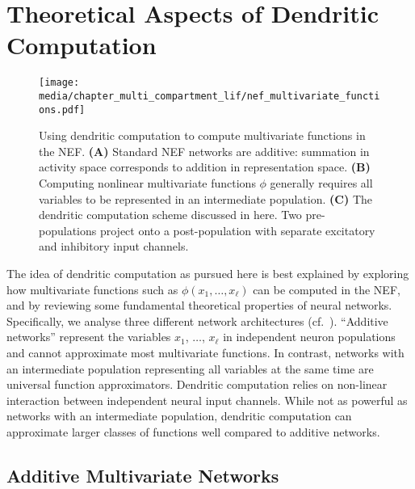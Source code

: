 \section{Theoretical Aspects of Dendritic Computation}
\label{sec:dendritic_computation_theory}

\begin{figure}
	\centering
	\texttt{[image: media/chapter\_multi\_compartment\_lif/nef\_multivariate\_functions.pdf]}%
	{\label{fig:nef_multivariate_functions_a}}%
	{\label{fig:nef_multivariate_functions_b}}%
	{\label{fig:nef_multivariate_functions_c}}%
	\caption[Using dendritic computation to compute multivariate functions in the NEF]{Using dendritic computation to compute multivariate functions in the NEF. \textbf{(A)} Standard NEF networks are additive: summation in activity space corresponds to addition in representation space.
	\textbf{(B)} Computing nonlinear multivariate functions $\phi$ generally requires all variables to be represented in an intermediate population.
	\textbf{(C)} The dendritic computation scheme discussed in here.
	Two pre-populations project onto a post-population with separate excitatory and inhibitory input channels.
	}
	\label{fig:nef_multivariate_functions}
\end{figure}

The idea of dendritic computation as pursued here is best explained by exploring how mul\-ti\-va\-ri\-ate functions such as $\phi(x_1, \ldots, x_\ell)$ can be computed in the NEF, and by reviewing some fundamental theoretical properties of neural networks.
Specifically, we analyse three different network architectures (cf.~).
\enquote{Additive networks} represent the variables $x_1$, $\ldots$, $x_\ell$ in independent neuron populations and cannot approximate most multivariate functions.
In contrast, networks with an intermediate population representing all variables at the same time are universal function approximators.
Dendritic computation relies on non-linear interaction between independent neural input channels.
While not as powerful as networks with an intermediate population, dendritic computation can approximate larger classes of functions well compared to additive networks.

\subsection{Additive Multivariate Networks}
\label{sec:additive_net}

